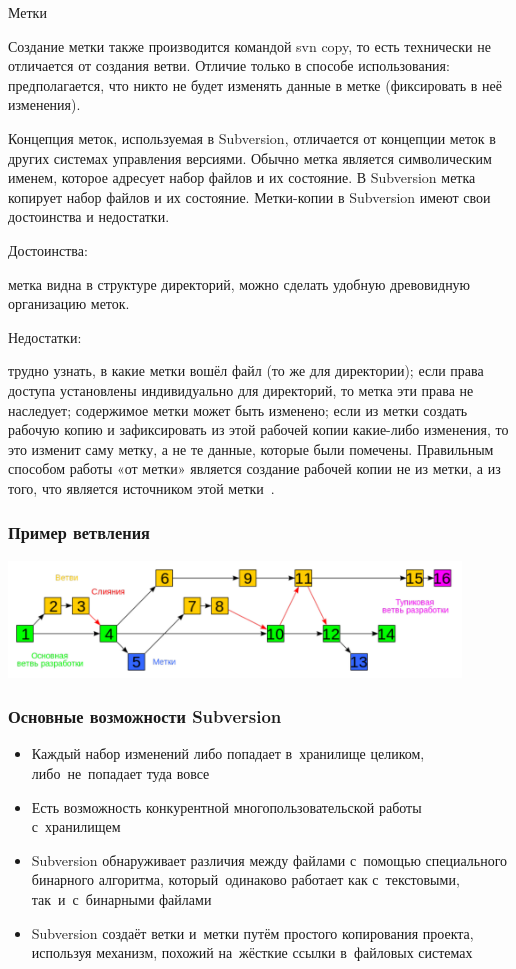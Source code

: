 \documentclass{../industrial-development}
\begin{document}
\lecturenotes

Метки

Создание метки также производится командой svn copy, то есть технически не отличается от создания ветви. Отличие только в способе использования: предполагается, что никто не будет изменять данные в метке (фиксировать в неё изменения).

Концепция меток, используемая в Subversion, отличается от концепции меток в других системах управления версиями. Обычно метка является символическим именем, которое адресует набор файлов и их состояние. В Subversion метка копирует набор файлов и их состояние. Метки-копии в Subversion имеют свои достоинства и недостатки.

Достоинства:

    метка видна в структуре директорий, можно сделать удобную древовидную организацию меток.

Недостатки:

    трудно узнать, в какие метки вошёл файл (то же для директории);
    если права доступа установлены индивидуально для директорий, то метка эти права не наследует;
    содержимое метки может быть изменено;
    если из метки создать рабочую копию и зафиксировать из этой рабочей копии какие-либо изменения, то это изменит саму метку, а не те данные, которые были помечены. Правильным способом работы «от метки» является создание рабочей копии не из метки, а из того, что является источником этой метки~\cite{SVNWikipedia}.


\begin{frame} \frametitle{Пример ветвления}
  \centerline{\includegraphics[width=0.9\textwidth]{branching-svn.pdf}}
\end{frame}

\begin{frame} \frametitle{Основные возможности Subversion}
  \begin{itemize}
  \item Каждый набор изменений либо попадает в~хранилище целиком, либо~не~попадает туда вовсе
  \item Есть возможность конкурентной многопользовательской работы с~хранилищем
  \item Subversion обнаруживает различия между файлами с~помощью специального бинарного алгоритма, который~одинаково работает как с~текстовыми, так~и~с~бинарными файлами
  \item Subversion создаёт ветки и~метки путём простого копирования проекта, используя механизм, похожий на~жёсткие ссылки в~файловых системах
  \end{itemize}
\end{frame}
\end{document}
